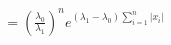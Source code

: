 \documentclass[preview]{standalone}
\begin{document}
\begin{align*}
= \left(\frac{\lambda_0}{\lambda_1}\right)^n e^{(\lambda_1-\lambda_0)\sum_{i=1}^n |x_i|}
\end{align*}
\end{document}
